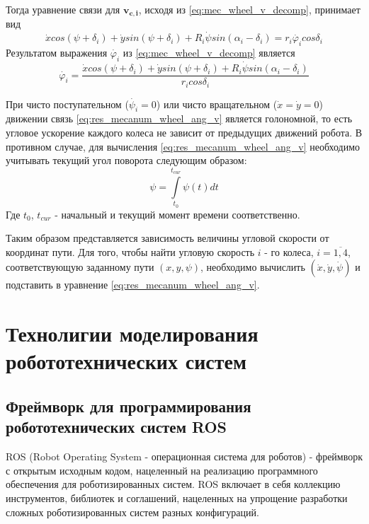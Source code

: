 \documentclass[oneside,final,14pt]{extreport}
\newcommand{\bs}{\boldsymbol}
\begin{document}
Тогда уравнение связи для $\bs{v_{c,i}}$, исходя из \ref{eq:mec_wheel_v_decomp}, принимает вид
\begin{equation}
\label{eq:res_mecanum_wheel_car}
\dot{x}
cos(\psi+\delta_{i})
+
\dot{y}
sin(\psi+\delta_{i})
+
R_{i}
\dot{\psi}
sin(\alpha_{i}-\delta_{i})
=
r_{i}\dot{\varphi_{i}}
cos\delta_{i}
\end{equation}
Результатом выражения $\dot{\varphi_{i}}$ из \ref{eq:mec_wheel_v_decomp} является
\begin{equation}
\label{eq:res_mecanum_wheel_ang_v}
\dot{\varphi_{i}}
=
\frac{
  \dot{x}
  cos(\psi+\delta_{i})
  +
  \dot{y}
  sin(\psi+\delta_{i})
  +
  R_{i}
  \dot{\psi}
  sin(\alpha_{i}-\delta_{i})
}
{
  r_{i}cos\delta_{i}
}
\end{equation}

При чисто поступательном ($\dot{\psi_{i}} = 0$) или чисто вращательном ($\dot{x}=\dot{y}=0$) движении связь \ref{eq:res_mecanum_wheel_ang_v} является голономной, то есть угловое ускорение каждого колеса не зависит от предыдущих движений робота. В противном случае, для вычисления \ref{eq:res_mecanum_wheel_ang_v} необходимо учитывать текущий угол поворота следующим образом:
\begin{equation}
\psi
=
\int\limits_{t_{0}}^{t_{cur}} \psi(t) dt
\end{equation}
Где $t_{0}$, $t_{cur}$ - начальный и текущий момент времени соответственно.

Таким образом представляется зависимость величины угловой скорости от координат пути. Для того, чтобы найти угловую скорость $i$ - го колеса, $i=\overline{1,4}$, соответствующую заданному пути $(x,y,\psi)$, необходимо вычислить $(\dot{x},\dot{y},\dot{\psi})$ и подставить в уравнение \ref{eq:res_mecanum_wheel_ang_v}.

\chapter{Технолигии моделирования робототехнических систем}
\section{Фреймворк для программирования робототехнических систем ROS }
ROS (Robot Operating System  -  операционная система для роботов) -  фреймворк с открытым исходным кодом, нацеленный на реализацию программного обеспечения для роботизированных систем\cite{ros.org}.  ROS включает в себя коллекцию инструментов, библиотек и соглашений, нацеленных на упрощение разработки сложных роботизированных систем разных конфигураций.
 
\end{document}
